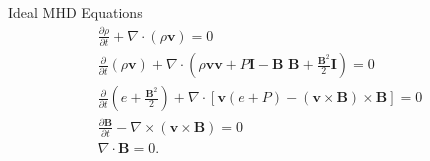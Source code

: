 \documentclass[10pt,aspectratio=169,usenames,dvipsnames]{beamer}
\begin{document}

\begin{frame}{Ideal MHD Equations}
\footnotesize
\begin{gather}
\frac{\partial \rho}{\partial t} + \nabla \cdot (\rho \textbf{v}) = 0 \\
\frac{\partial}{\partial t} (\rho \textbf{v})+ \nabla \cdot \left( \rho \textbf{v} \textbf{v} + P \textbf{I} - \textbf{B B} + \frac{\textbf{B}^2}{2} \textbf{I} \right) = 0\\
\frac{\partial}{\partial t} \left( e + \frac{\textbf{B}^2}{2} \right) + \nabla \cdot \left[ \textbf{v} ( e + P) -  (\textbf{v} \times \textbf{B}) \times \textbf{B} \right]  =  0 \\
\frac{\partial \textbf{B}}{\partial t} - \nabla \times (\textbf{v} \times \textbf{B}) = 0 \\
\nabla \cdot \textbf{B} =0.
\end{gather}
\end{frame}
\end{document}
